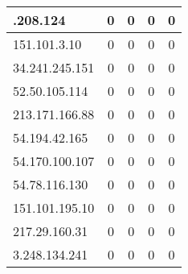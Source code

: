 \documentclass{article}
\begin{document}
\begin{longtable}{|>{\raggedright\arraybackslash}p{3cm}|c|c|c|c|}
    52.31.208.124 & 0 & 0 & 0 & 0 \\
    \hline
    
    
    \rowcolor{lightgreen} %
    
    151.101.3.10 & 0 & 0 & 0 & 0 \\
    \hline
    
    
    \rowcolor{lightgreen} %
    
    34.241.245.151 & 0 & 0 & 0 & 0 \\
    \hline
    
    
    \rowcolor{lightgreen} %
    
    52.50.105.114 & 0 & 0 & 0 & 0 \\
    \hline
    
    
    \rowcolor{lightgreen} %
    
    213.171.166.88 & 0 & 0 & 0 & 0 \\
    \hline
    
    
    \rowcolor{lightgreen} %
    
    54.194.42.165 & 0 & 0 & 0 & 0 \\
    \hline
    
    
    \rowcolor{lightgreen} %
    
    54.170.100.107 & 0 & 0 & 0 & 0 \\
    \hline
    
    
    \rowcolor{lightgreen} %
    
    54.78.116.130 & 0 & 0 & 0 & 0 \\
    \hline
    
    
    \rowcolor{lightgreen} %
    
    151.101.195.10 & 0 & 0 & 0 & 0 \\
    \hline
    
    
    \rowcolor{lightgreen} %
    
    217.29.160.31 & 0 & 0 & 0 & 0 \\
    \hline
    
    
    \rowcolor{lightgreen} %
    
    3.248.134.241 & 0 & 0 & 0 & 0 \\
    \hline
    

\end{longtable}
\end{document}
